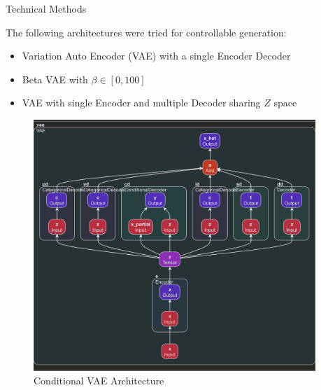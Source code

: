 \documentclass[final]{beamer}
\newlength{\onecolwid}
\newlength{\twocolwid}
\begin{document}
\begin{frame}[t]
\begin{columns}[t]
\begin{column}{\twocolwid}
\begin{columns}[t,totalwidth=\twocolwid]
\begin{column}{\onecolwid}



\begin{block}{Technical Methods}

The following architectures were tried for controllable generation:

\begin{itemize}
\item Variation Auto Encoder (VAE) with a single Encoder Decoder
\item Beta VAE with $\beta \in [0, 100]$
\item VAE with single Encoder and multiple Decoder sharing $Z$ space
\end{itemize}

\begin{figure}
\includegraphics[width=0.8\linewidth]{midi_vae.png}
\caption{Conditional VAE Architecture}
\end{figure}

\end{block}


\end{column} %

\begin{column}{\onecolwid}\vspace{-.6in} %


\end{column}
\end{columns}
\end{column}
\end{columns}
\end{frame}
\end{document}
